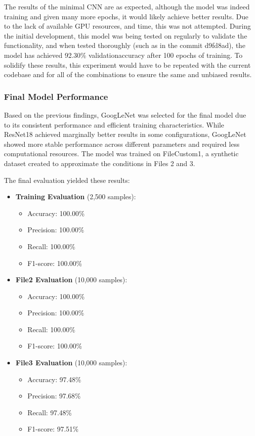 \documentclass[conference]{IEEEtran}
\begin{document}
The results of the minimal CNN are as expected, although the model was indeed training and given many more epochs, it would likely achieve better results. Due to
the lack of available GPU resources, and time, this was not attempted. During the initial development, this model was being tested on regularly 
to validate the functionality, and when tested thoroughly (such as in the commit d9fd8ad), the model has achieved 92.30\% validationaccuracy after
100 epochs of training. To solidify these results, this experiment would have to be repeated with the current codebase and for all of the combinations to
ensure the same and unbiased results. 

\subsubsection{Final Model Performance}

Based on the previous findings, GoogLeNet was selected for the final model due to its consistent performance and efficient training
characteristics. While ResNet18 achieved marginally better results in some configurations, GoogLeNet showed more stable performance
across different parameters and required less computational resources. The model was trained on FileCustom1, a synthetic dataset created
to approximate the conditions in Files 2 and 3.

The final evaluation yielded these results:
\begin{itemize}
    \item \textbf{Training Evaluation} (2,500 samples):
        \begin{itemize}
            \item Accuracy: 100.00\%
            \item Precision: 100.00\%
            \item Recall: 100.00\%
            \item F1-score: 100.00\%
        \end{itemize}
    \item \textbf{File2 Evaluation} (10,000 samples):
        \begin{itemize}
            \item Accuracy: 100.00\%
            \item Precision: 100.00\%
            \item Recall: 100.00\%
            \item F1-score: 100.00\%
        \end{itemize}
    \item \textbf{File3 Evaluation} (10,000 samples):
        \begin{itemize}
            \item Accuracy: 97.48\%
            \item Precision: 97.68\%
            \item Recall: 97.48\%
            \item F1-score: 97.51\%
        \end{itemize}
\end{itemize}
\end{document}
